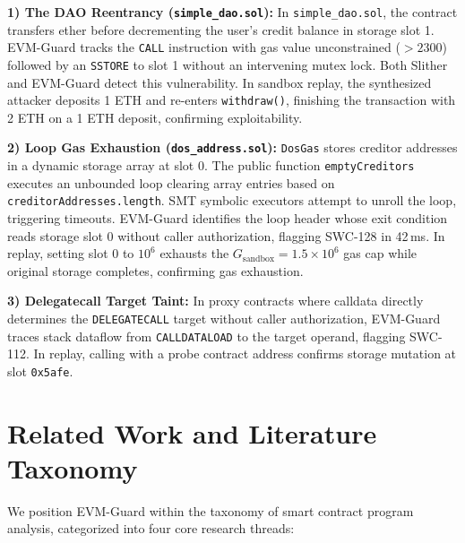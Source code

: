 \documentclass[conference]{IEEEtran}
\begin{document}
\smallskip
\noindent\textbf{1) The DAO Reentrancy (\texttt{simple\_dao.sol}):} In \texttt{simple\_dao.sol}, the contract transfers ether before decrementing the user's credit balance in storage slot 1. EVM-Guard tracks the \texttt{CALL} instruction with gas value unconstrained ($> 2300$) followed by an \texttt{SSTORE} to slot 1 without an intervening mutex lock. Both Slither and EVM-Guard detect this vulnerability. In sandbox replay, the synthesized attacker deposits 1 ETH and re-enters \texttt{withdraw()}, finishing the transaction with 2 ETH on a 1 ETH deposit, confirming exploitability.

\smallskip
\noindent\textbf{2) Loop Gas Exhaustion (\texttt{dos\_address.sol}):} \texttt{DosGas} stores creditor addresses in a dynamic storage array at slot 0. The public function \texttt{emptyCreditors} executes an unbounded loop clearing array entries based on \texttt{creditorAddresses.length}. SMT symbolic executors attempt to unroll the loop, triggering timeouts. EVM-Guard identifies the loop header whose exit condition reads storage slot 0 without caller authorization, flagging SWC-128 in 42\,ms. In replay, setting slot 0 to $10^6$ exhausts the $G_{\mathrm{sandbox}} = 1.5\times10^6$ gas cap while original storage completes, confirming gas exhaustion.

\smallskip
\noindent\textbf{3) Delegatecall Target Taint:} In proxy contracts where calldata directly determines the \texttt{DELEGATECALL} target without caller authorization, EVM-Guard traces stack dataflow from \texttt{CALLDATALOAD} to the target operand, flagging SWC-112. In replay, calling with a probe contract address confirms storage mutation at slot \texttt{0x5afe}.

\section{Related Work and Literature Taxonomy}\label{sec:related_work}

We position EVM-Guard within the taxonomy of smart contract program analysis, categorized into four core research threads:
\end{document}
